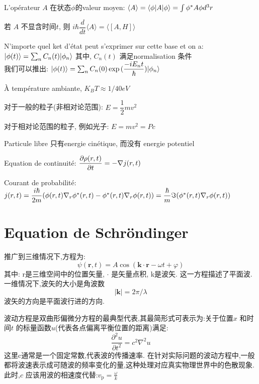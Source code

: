L'op\'erateur $A$ 在状态$\phi$的valeur moyen: $\langle A \rangle = \langle\phi|A|\phi\rangle = \int \phi^* A \phi d^3 r$

若 $A$ 不显含时间$t$, 则 $i\hbar \dfrac{d}{dt}\langle A \rangle = \langle [A,H] \rangle$

\bigskip
N'importe quel ket d'\'etat peut s'exprimer sur cette base et on a: $|\phi(t)\rangle = \sum_n C_n(t) |\phi_n\rangle$ 其中, $C_n(t)$ 满足normalisation 条件 \\
我们可以推出: $|\phi(t)\rangle = \sum_n C_n(0) \exp{(\dfrac{-i E_n t}{\hbar})} |\phi_n\rangle$
\bigskip

\`A temp\'erature ambiante, $K_B T \approx 1/40 eV$

对于一般的粒子(非相对论范围): $E = \dfrac{1}{2} mv^2$

对于相对论范围的粒子, 例如光子: $E = mv^2 = Pc$

Particule libre 只有energie cin\'etique, 而没有 energie potentiel

Equation de continuit\'e: $\dfrac{\partial \rho(r,t)}{\partial t} = - \nabla j(r,t)$

Courant de probabilit\'e: $j(r,t) = \dfrac{i\hbar}{2m} (\phi(r,t) \nabla _r{\phi^*(r,t)} - \phi^*(r,t) \nabla _r{\phi(r,t)}) = \dfrac{\hbar}{m} \Im{(\phi^*(r,t) \nabla _r{\phi(r,t)})} $

\section{Equation de Schr\"ondinger}
推广到三维情况下,方程为:
$$
\psi \left({\mathbf r}, t \right) = A \cos \left({\mathbf k} \cdot {\mathbf r} - \omega t + \varphi \right)
$$
其中:
r是三维空间中的位置矢量,
$\cdot$ 是矢量点积,
k是波矢.
这一方程描述了平面波.一维情况下,波矢的大小是角波数
$$|{\mathbf k}| = 2\pi/\lambda$$
波矢的方向是平面波行进的方向.

波动方程是双曲形偏微分方程的最典型代表,其最简形式可表示为:关于位置$x$ 和时间$t$ 的标量函数$u$(代表各点偏离平衡位置的距离)满足:
$$
\dfrac{\partial^2 u}{\partial t^2} = c^2 \nabla^2u
$$
这里c通常是一个固定常数,代表波的传播速率.
在针对实际问题的波动方程中,一般都将波速表示成可随波的频率变化的量,这种处理对应真实物理世界中的色散现象.此时,$ c$  应该用波的相速度代替:$v_\mathrm{p} = \frac{\omega}{k}$

